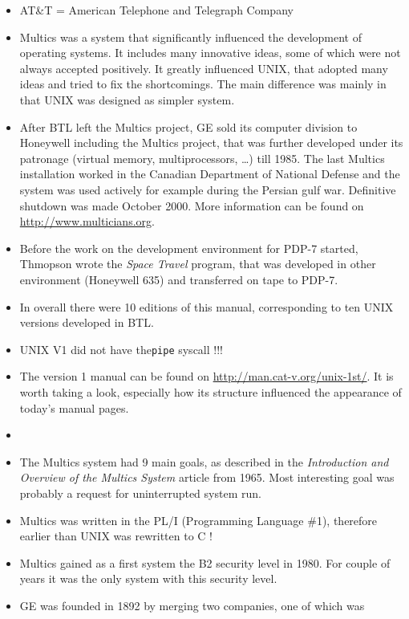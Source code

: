 \begin{itemize}
\item AT\&T = American Telephone and Telegraph Company
\item Multics was a system that significantly influenced the development of
operating systems. It includes many innovative ideas, some of which were not
always accepted positively. It greatly influenced UNIX, that adopted many ideas
and tried to fix the shortcomings. The main difference was mainly in that UNIX
was designed as simpler system.
\item After BTL left the Multics project, GE sold its computer division to
Honeywell including the Multics project, that was further developed under its
patronage (virtual memory, multiprocessors, \dots) till 1985.
The last Multics installation worked in the Canadian Department of National
Defense and the system was used actively for example during the Persian gulf
war. Definitive shutdown was made  October 2000. More information can be
found on \url{http://www.multicians.org}.
\item Before the work on the development environment for PDP-7 started, Thmopson
wrote the \emph{Space Travel} program, that was developed in other environment
(Honeywell 635) and transferred on tape to PDP-7.
\item In overall there were 10 editions of this manual, corresponding to ten
UNIX versions developed in BTL.
\item UNIX V1 did not have the\texttt{pipe} syscall !!!
\item The version 1 manual can be found on
\url{http://man.cat-v.org/unix-1st/}.
It is worth taking a look, especially how its structure influenced the
appearance of today's manual pages.
\item {}
\item The Multics system had 9 main goals, as described in the
\emph{Introduction and Overview of the Multics System} article from 1965.
Most interesting goal was probably a request for uninterrupted system run.
\item Multics was written in the PL/I (Programming Language \#1), therefore
earlier than UNIX was rewritten to C !
\item Multics gained as a first system the B2 security level in 1980.
For couple of years it was the only system with this security level.
\item GE was founded in 1892 by merging two companies, one of which was

\end{itemize}
